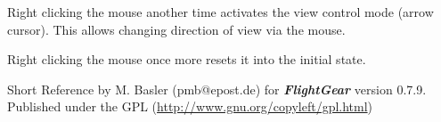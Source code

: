 \documentclass[10pt]{article}
\newcommand{\FlightGear}{{\itshape\bfseries FlightGear}}
\newcommand{\web}[1]{\href{#1}{#1}}
\begin{document}
 \noindent
 Right clicking the mouse another time activates the view control mode (arrow cursor).
 This allows changing direction of view via the mouse.

 \noindent
 Right clicking the mouse once more resets it into the initial state.
 \medskip

 \noindent
 Short Reference by M. Basler (pmb@epost.de) for \FlightGear{} version 0.7.9.\\
 Published under the GPL (\web{http://www.gnu.org/copyleft/gpl.html})
\end{document}
